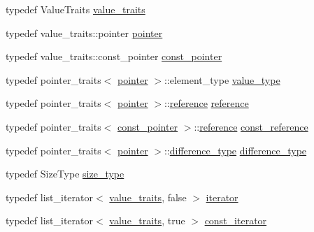 \begin{DoxyCompactItemize}
\item 
typedef Value\+Traits \hyperlink{classboost_1_1intrusive_1_1list__impl_a5cd55672f6df367749d91ef708834126}{value\+\_\+traits}
\item 
typedef value\+\_\+traits\+::pointer \hyperlink{classboost_1_1intrusive_1_1list__impl_a671027d235426ed75ab9e4b2e090afe5}{pointer}
\item 
typedef value\+\_\+traits\+::const\+\_\+pointer \hyperlink{classboost_1_1intrusive_1_1list__impl_abc0f6e1c4c5f44b9edd5b96e798a618c}{const\+\_\+pointer}
\item 
typedef pointer\+\_\+traits$<$ \hyperlink{classboost_1_1intrusive_1_1list__impl_a671027d235426ed75ab9e4b2e090afe5}{pointer} $>$\+::element\+\_\+type \hyperlink{classboost_1_1intrusive_1_1list__impl_a011b08f2310cd73b4691870fc22e2cec}{value\+\_\+type}
\item 
typedef pointer\+\_\+traits$<$ \hyperlink{classboost_1_1intrusive_1_1list__impl_a671027d235426ed75ab9e4b2e090afe5}{pointer} $>$\+::\hyperlink{classboost_1_1intrusive_1_1list__impl_a881763b587dbe7c0237a552a9e89755a}{reference} \hyperlink{classboost_1_1intrusive_1_1list__impl_a881763b587dbe7c0237a552a9e89755a}{reference}
\item 
typedef pointer\+\_\+traits$<$ \hyperlink{classboost_1_1intrusive_1_1list__impl_abc0f6e1c4c5f44b9edd5b96e798a618c}{const\+\_\+pointer} $>$\+::\hyperlink{classboost_1_1intrusive_1_1list__impl_a881763b587dbe7c0237a552a9e89755a}{reference} \hyperlink{classboost_1_1intrusive_1_1list__impl_a3d37629151c76fb8389ac3ba3b359201}{const\+\_\+reference}
\item 
typedef pointer\+\_\+traits$<$ \hyperlink{classboost_1_1intrusive_1_1list__impl_a671027d235426ed75ab9e4b2e090afe5}{pointer} $>$\+::\hyperlink{classboost_1_1intrusive_1_1list__impl_a7053eac84f0c15a33c8192687d0840e3}{difference\+\_\+type} \hyperlink{classboost_1_1intrusive_1_1list__impl_a7053eac84f0c15a33c8192687d0840e3}{difference\+\_\+type}
\item 
typedef Size\+Type \hyperlink{classboost_1_1intrusive_1_1list__impl_a3e340b93081e392fba09de7145fb5733}{size\+\_\+type}
\item 
typedef list\+\_\+iterator$<$ \hyperlink{classboost_1_1intrusive_1_1list__impl_a5cd55672f6df367749d91ef708834126}{value\+\_\+traits}, false $>$ \hyperlink{classboost_1_1intrusive_1_1list__impl_a15c0189bf62eb9fb98bc07ef10b8cb23}{iterator}
\item 
typedef list\+\_\+iterator$<$ \hyperlink{classboost_1_1intrusive_1_1list__impl_a5cd55672f6df367749d91ef708834126}{value\+\_\+traits}, true $>$ \hyperlink{classboost_1_1intrusive_1_1list__impl_af4ced710fe02662c5650d161af83d8cd}{const\+\_\+iterator}

\end{DoxyCompactItemize}
